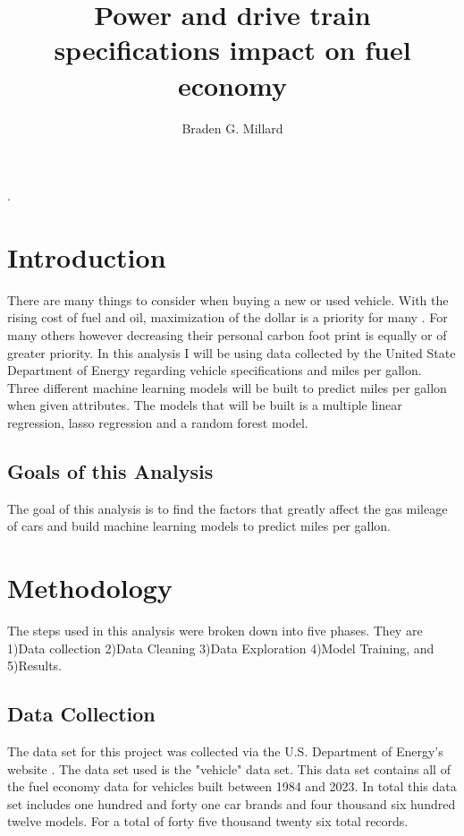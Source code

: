 \documentclass[runningheads]{llncs}
\begin{document}
%
\title{Power and drive train specifications impact on fuel economy }
%

%
\author{Braden G. Millard}
%
.
%
%
\maketitle              %
%
\begin{abstract}

\end{abstract}
%
%
%
\section{Introduction}

There are many things to consider when buying a new or used vehicle.  With the rising cost of fuel and oil, maximization of the dollar is a priority for many \cite{gasprices}. For many others however decreasing their personal carbon foot print is equally or of greater priority\cite{carbonfootprint}. In this analysis I will be using data collected by the United State Department of Energy regarding vehicle specifications and miles per gallon. Three different machine learning models will be built to predict miles per gallon when given attributes. The models that will be built is a multiple linear regression, lasso regression and a random forest model.

\subsection{Goals of this Analysis} 

The goal of this analysis is to find the factors that greatly affect the gas mileage of cars and build machine learning models to predict miles per gallon.


\section{Methodology}

The steps used in this analysis were broken down into five phases. They are 1)Data collection 2)Data Cleaning 3)Data Exploration 4)Model Training, and 5)Results.

\subsection{Data Collection}
The data set for this project was collected via the U.S. Department of Energy's website \cite{rawdata}. The data set used is the "vehicle" data set. This data set contains all of the fuel economy data for vehicles built between 1984 and 2023. In total this data set includes one hundred and forty one car brands and four thousand six hundred twelve models. For a total of forty five thousand twenty six total records.
\end{document}
